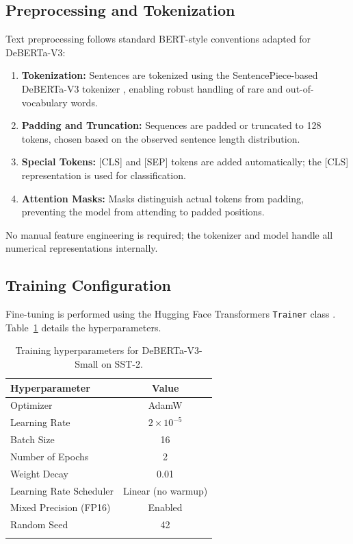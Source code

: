\documentclass[pdflatex,sn-mathphys-num]{sn-jnl}
\theoremstyle{thmstyleone}%
\theoremstyle{thmstyletwo}%
\theoremstyle{thmstylethree}%
\begin{document}
\subsection{Preprocessing and Tokenization}

Text preprocessing follows standard BERT-style conventions adapted for DeBERTa-V3:

\begin{enumerate}
    \item \textbf{Tokenization:} Sentences are tokenized using the SentencePiece-based DeBERTa-V3 tokenizer \cite{kudo2018sentencepiece}, enabling robust handling of rare and out-of-vocabulary words.
    
    \item \textbf{Padding and Truncation:} Sequences are padded or truncated to 128 tokens, chosen based on the observed sentence length distribution.
    
    \item \textbf{Special Tokens:} [CLS] and [SEP] tokens are added automatically; the [CLS] representation is used for classification.
    
    \item \textbf{Attention Masks:} Masks distinguish actual tokens from padding, preventing the model from attending to padded positions.
\end{enumerate}

No manual feature engineering is required; the tokenizer and model handle all numerical representations internally.

\subsection{Training Configuration}

Fine-tuning is performed using the Hugging Face Transformers \texttt{Trainer} class \cite{wolf2020transformers}. Table~\ref{tab:training_config} details the hyperparameters.

\begin{table}[h]
\centering
\begin{tabular}{@{}lc@{}}
\toprule
\textbf{Hyperparameter} & \textbf{Value} \\
\midrule
Optimizer & AdamW \cite{kingma2014adam} \\
Learning Rate & \(2 \times 10^{-5}\) \\
Batch Size & 16 \\
Number of Epochs & 2 \\
Weight Decay & 0.01 \\
Learning Rate Scheduler & Linear (no warmup) \\
Mixed Precision (FP16) & Enabled \\
Random Seed & 42 \\
\botrule
\end{tabular}
\caption{Training hyperparameters for DeBERTa-V3-Small on SST-2.}
\label{tab:training_config}
\end{table}
\end{document}
